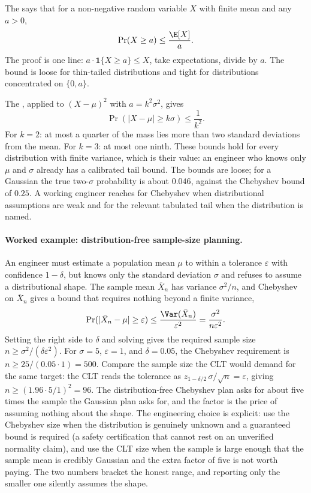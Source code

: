The  says that for a non-negative random
variable $X$ with finite mean and any $a > 0$,
\[
\Pr(X \geq a) \leq \frac{\E[X]}{a}.
\]
The proof is one line: $a \cdot \mathbf{1}\{X \geq a\} \leq X$,
take expectations, divide by $a$. The bound is loose for thin-tailed
distributions and tight for distributions concentrated on $\{0, a\}$.

The , applied to $(X - \mu)^{2}$ with
$a = k^{2}\sigma^{2}$, gives
\[
\Pr(|X - \mu| \geq k\sigma) \leq \frac{1}{k^{2}}.
\]
For $k = 2$: at most a quarter of the mass lies more than two
standard deviations from the mean. For $k = 3$: at most one ninth.
These bounds hold for every distribution with finite variance,
which is their value: an engineer who knows only $\mu$ and $\sigma$
already has a calibrated tail bound. The bounds are loose; for a
Gaussian the true two-$\sigma$ probability is about $0.046$, against
the Chebyshev bound of $0.25$. A working engineer reaches for
Chebyshev when distributional assumptions are weak and for the
relevant tabulated tail when the distribution is named.

\paragraph{Worked example: distribution-free sample-size planning.} An
engineer must estimate a population mean $\mu$ to within a tolerance
$\varepsilon$ with confidence $1 - \delta$, but knows only the standard
deviation $\sigma$ and refuses to assume a distributional shape. The
sample mean $\bar X_{n}$ has variance $\sigma^{2}/n$, and Chebyshev on
$\bar X_{n}$ gives a bound that requires nothing beyond a finite
variance,
\[
\Pr(|\bar X_{n} - \mu| \geq \varepsilon)
\leq \frac{\Var(\bar X_{n})}{\varepsilon^{2}}
= \frac{\sigma^{2}}{n\varepsilon^{2}}.
\]
Setting the right side to $\delta$ and solving gives the required sample
size $n \geq \sigma^{2}/(\delta\varepsilon^{2})$. For $\sigma = 5$,
$\varepsilon = 1$, and $\delta = 0.05$, the Chebyshev requirement is
$n \geq 25/(0.05 \cdot 1) = 500$. Compare the sample size the CLT would
demand for the same target: the CLT reads the tolerance as $z_{1 -
\delta/2}\,\sigma/\sqrt{n} = \varepsilon$, giving $n \geq (1.96 \cdot
5/1)^{2} = 96$. The distribution-free Chebyshev plan asks for about five
times the sample the Gaussian plan asks for, and the factor is the price
of assuming nothing about the shape. The engineering choice is explicit:
use the Chebyshev size when the distribution is genuinely unknown and a
guaranteed bound is required (a safety certification that cannot rest on
an unverified normality claim), and use the CLT size when the sample is
large enough that the sample mean is credibly Gaussian and the extra
factor of five is not worth paying. The two numbers bracket the honest
range, and reporting only the smaller one silently assumes the shape.

